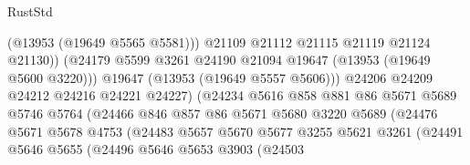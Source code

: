 \begin{lexlean}{RustStd}
\begin{coremodule}
                                          (@13953 (@19649 @5565 @5581)))
                                        @21109
                                        @21112
                                        @21115
                                        @21119
                                        @21124
                                        @21130))
                                    (@24179
                                      @5599
                                      @3261
                                      @24190
                                      @21094
                                      @19647
                                      (@13953 (@19649 @5600 @3220)))
                                    @19647
                                    (@13953 (@19649 @5557 @5606)))
                                  @24206
                                  @24209
                                  @24212
                                  @24216
                                  @24221
                                  @24227)
                                (@24234
                                  @5616
                                  @858
                                  @881
                                  @86
                                  @5671
                                  @5689
                                  @5746
                                  @5764
                                  (@24466
                                    @846
                                    @857
                                    @86
                                    @5671
                                    @5680
                                    @3220
                                    @5689
                                    (@24476
                                      @5671
                                      @5678
                                      @4753
                                      (@24483
                                        @5657
                                        @5670
                                        @5677
                                        @3255
                                        @5621
                                        @3261
                                        (@24491
                                          @5646
                                          @5655
                                          (@24496
                                            @5646
                                            @5653
                                            @3903
                                            (@24503

\end{coremodule}
\end{lexlean}

